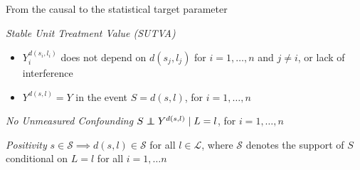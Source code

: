 \documentclass{beamer}
\begin{document}

\begin{frame}[c]{From the causal to the statistical target parameter}

\begin{center}
\begin{tcolorbox}
\begin{assumption}{1}{\textit{Stable Unit Treatment Value (SUTVA)}}\label{sutva}
  \begin{itemize}
    \itemsep2pt
    \item $Y^{d(s_i, l_i)}_i$ does not depend on $d(s_j, l_j)$ for
        $i = 1, \ldots, n$ and $j \neq i$, or lack of
        interference~\citep{cox1958planning}
     \item $Y^{d(s, l)} = Y$ in the event $S = d(s, l)$, for $i = 1, \ldots, n$
  \end{itemize}
\end{assumption}
\end{tcolorbox}
\vspace{-0.7em}
\begin{tcolorbox}
\begin{assumption}{2}{\textit{No Unmeasured Confounding}}\label{ignorability}
  $S \indep Y^{d(s, l)} \mid L = l$, for $i = 1, \ldots, n$
\end{assumption}
\end{tcolorbox}
\vspace{-0.7em}
\begin{tcolorbox}
\begin{assumption}{3}{\textit{Positivity}}\label{positivity}
  $s \in \mathcal{S} \implies d(s, l) \in \mathcal{S}$ for all
  $l \in \mathcal{L}$, where $\mathcal{S}$ denotes the support of $S$
  conditional on $L = l$ for all $i = 1, \ldots n$
\end{assumption}
\end{tcolorbox}
\end{center}


\end{frame}
\end{document}
